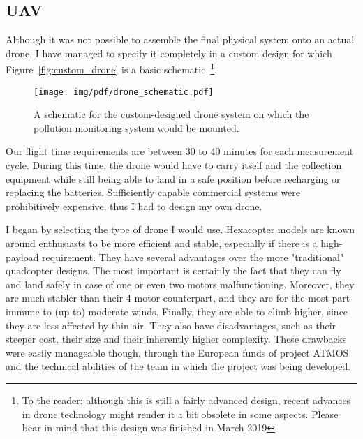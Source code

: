 \subsection{\acrlong{UAV}}%
\label{sub:methods_uav}

Although it was not possible to assemble the final physical system onto
an actual drone, I have managed to specify it completely in a custom
design for which Figure~\ref{fig:custom_drone} is a basic
schematic~\footnote{To the reader: although this is still a fairly
advanced design, recent advances in drone technology might render it
a bit obsolete in some aspects. Please bear in mind that this design
was finished in March 2019}.

\begin{figure}[htpb]
    \centering
    \texttt{[image: img/pdf/drone\_schematic.pdf]}
    \caption{A schematic for the custom-designed drone system on which
    the pollution monitoring system would be mounted.}%
    \label{fig:img/pdf/drone_schematic}
\end{figure}

Our flight time requirements are between 30 to 40 minutes for each
measurement cycle. During this time, the drone would have to carry
itself and the collection equipment while still being able to land in a
safe position before recharging or replacing the batteries. Sufficiently
capable commercial systems were prohibitively expensive, thus I had to
design my own drone.

I began by selecting the type of drone I would use. Hexacopter models
are known around enthusiasts to be more efficient and stable, especially
if there is a high-payload requirement. They have several advantages
over the more "traditional" quadcopter designs. The most important is
certainly the fact that they can fly and land safely in case of one or
even two motors malfunctioning. Moreover, they are much stabler than
their 4 motor counterpart, and they are for the most part immune to (up
to) moderate winds. Finally, they are able to climb higher, since they
are less affected by thin air. They also have disadvantages, such as
their steeper cost, their size and their inherently higher complexity.
These drawbacks were easily manageable though, through the European
funds of project \gls{ATMOS} and the technical abilities of the team in
which the project was being developed.

